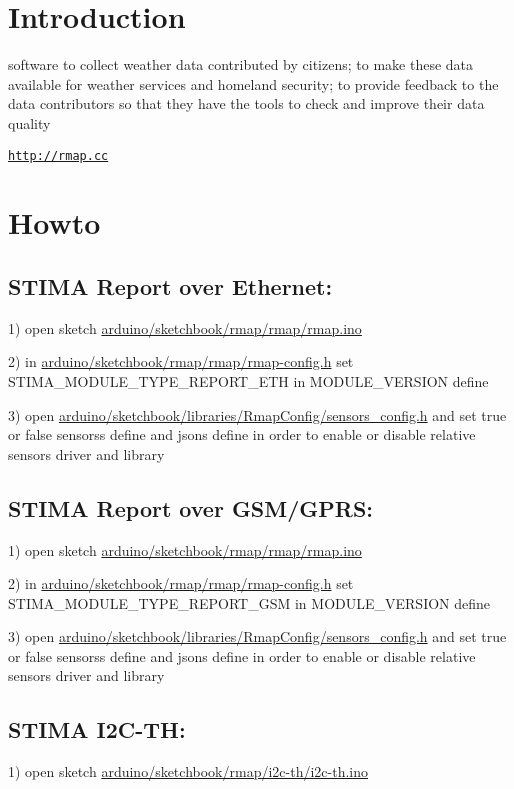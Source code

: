 \hypertarget{index_introduction}{}\section{Introduction}\label{index_introduction}
software to collect weather data contributed by citizens; to make these data available for weather services and homeland security; to provide feedback to the data contributors so that they have the tools to check and improve their data quality

\href{http://rmap.cc}{\tt http\+://rmap.\+cc}\hypertarget{index_howto}{}\section{Howto}\label{index_howto}
\hypertarget{index_report_eth}{}\subsection{S\+T\+I\+M\+A Report over Ethernet\+:}\label{index_report_eth}
1) open sketch \hyperlink{rmap_8ino}{arduino/sketchbook/rmap/rmap/rmap.\+ino}

2) in \hyperlink{rmap-config_8h}{arduino/sketchbook/rmap/rmap/rmap-\/config.\+h} set S\+T\+I\+M\+A\+\_\+\+M\+O\+D\+U\+L\+E\+\_\+\+T\+Y\+P\+E\+\_\+\+R\+E\+P\+O\+R\+T\+\_\+\+E\+TH in M\+O\+D\+U\+L\+E\+\_\+\+V\+E\+R\+S\+I\+ON define

3) open \hyperlink{sensors__config_8h}{arduino/sketchbook/libraries/\+Rmap\+Config/sensors\+\_\+config.\+h} and set true or false sensors\textquotesingle{}s define and json\textquotesingle{}s define in order to enable or disable relative sensor\textquotesingle{}s driver and library\hypertarget{index_report_gsm}{}\subsection{S\+T\+I\+M\+A Report over G\+S\+M/\+G\+P\+R\+S\+:}\label{index_report_gsm}
1) open sketch \hyperlink{rmap_8ino}{arduino/sketchbook/rmap/rmap/rmap.\+ino}

2) in \hyperlink{rmap-config_8h}{arduino/sketchbook/rmap/rmap/rmap-\/config.\+h} set S\+T\+I\+M\+A\+\_\+\+M\+O\+D\+U\+L\+E\+\_\+\+T\+Y\+P\+E\+\_\+\+R\+E\+P\+O\+R\+T\+\_\+\+G\+SM in M\+O\+D\+U\+L\+E\+\_\+\+V\+E\+R\+S\+I\+ON define

3) open \hyperlink{sensors__config_8h}{arduino/sketchbook/libraries/\+Rmap\+Config/sensors\+\_\+config.\+h} and set true or false sensors\textquotesingle{}s define and json\textquotesingle{}s define in order to enable or disable relative sensor\textquotesingle{}s driver and library\hypertarget{index_i2c-th}{}\subsection{S\+T\+I\+M\+A I2\+C-\/\+T\+H\+:}\label{index_i2c-th}
1) open sketch \hyperlink{i2c-th_8ino}{arduino/sketchbook/rmap/i2c-\/th/i2c-\/th.\+ino}

